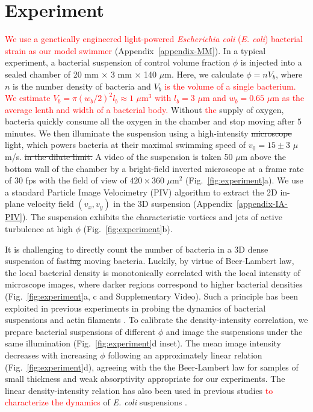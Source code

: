 \documentclass[twocolumn,aps,prx,amsmath,amssymb,longbibliography,superscriptaddress]{revtex4-2}
\begin{document}
\section{Experiment}

\textcolor{red}{We use a genetically engineered light-powered \textit{Escherichia coli} (\textit{E. coli}) bacterial strain as our model swimmer} (Appendix~\ref{appendix-MM}).
In a typical experiment, a bacterial suspension of control volume fraction $\phi$ is injected into a sealed chamber of 20 mm $\times$ 3 mm $\times$ 140 $\mu$m. Here, we calculate $\phi = n V_b$, where $n$ is the number density of bacteria and $V_b$ \textcolor{red}{is the volume of a single bacterium. We estimate $V_b = \pi (w_b/2)^2 l_b \approx 1$ $\mu$m$^3$ with $l_b = 3$ $\mu$m and $w_b = 0.65$ $\mu$m as the average lenth and width of a bacterial body.}
Without \textcolor{red}{the} supply of oxygen, bacteria quickly consume all the oxygen in the chamber and stop moving after $5$ minutes.
We then illuminate the suspension using a high-intensity \sout{microscope} light, which powers bacteria at their maximal swimming speed of $v_0 = 15 \pm 3$ $\mu$m/s. \sout{in the dilute limit.}
A video of the suspension is taken 50 $\mu$m above the bottom wall of the chamber by a bright-field inverted microscope at a frame rate of $30$ fps with the field of view of $420 \times 360$ $\mu$m$^2$ (Fig.~\ref{fig:experiment}a).
We use a standard Particle Image Velocimetry (PIV) algorithm
to extract the 2D in-plane velocity field $(v_x,v_y)$ in the 3D suspension (Appendix~\ref{appendix-IA-PIV}). The suspension exhibits the characteristic vortices and jets of active turbulence at high $\phi$ (Fig.~\ref{fig:experiment}b).

It is challenging to directly count the number of bacteria in a 3D dense suspension of fast\sout{ing} moving bacteria. Luckily, by virtue of Beer-Lambert law, the local bacterial density is monotonically correlated with the local intensity of microscope images, where darker regions correspond to higher bacterial densities (Fig.~\ref{fig:experiment}a, c and Supplementary Video). Such a principle has been exploited in previous experiments in probing the dynamics of bacterial suspensions and actin filaments \cite{Sokolov2009, Wilson2011, Schaller2013}. To calibrate the density-intensity correlation, we prepare bacterial suspensions of different $\phi$ and image the suspensions under the same illumination (Fig.~\ref{fig:experiment}d inset). The mean image intensity decreases with increasing $\phi$ following an approximately linear relation (Fig.~\ref{fig:experiment}d), agreeing with the the Beer-Lambert law for samples of small thickness and weak absorptivity appropriate for our experiments. The linear density-intensity relation has also been used in previous studies \textcolor{red}{to characterize the dynamics} of \textit{E. coli} suspensions \cite{Wilson2011}.
\end{document}
